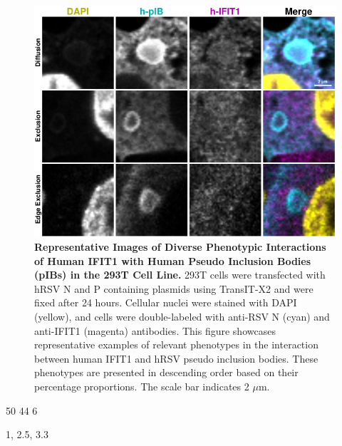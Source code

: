 \begin{figure}
    \centering
    \includegraphics[width=1\linewidth]{09. Chapter 4/Figs/01. pIB/02. IFIT1/03. i1-293t-hnhp.pdf}
    \caption[Representative Images of Diverse Phenotypic Interactions of Human IFIT1 with Human Pseudo Inclusion Bodies (pIBs) in the 293T Cell Line.]{\textbf{Representative Images of Diverse Phenotypic Interactions of Human IFIT1 with Human Pseudo Inclusion Bodies (pIBs) in the 293T Cell Line.} 293T cells were transfected with hRSV N and P containing plasmids using TransIT-X2 and were fixed after 24 hours. Cellular nuclei were stained with DAPI (yellow), and cells were double-labeled with anti-RSV N (cyan) and anti-IFIT1 (magenta) antibodies. This figure showcases representative examples of relevant phenotypes in the interaction between human IFIT1 and hRSV pseudo inclusion bodies. These phenotypes are presented in descending order based on their percentage proportions. The scale bar indicates 2 \(\mu \mbox{m}\).}
    \label{fig:Representative Images of Diverse Phenotypic Interactions of Human IFIT1 with Human Pseudo Inclusion Bodies (pIBs) in the 293T Cell Line}
\end{figure}

50 44 6

1, 2.5, 3.3

